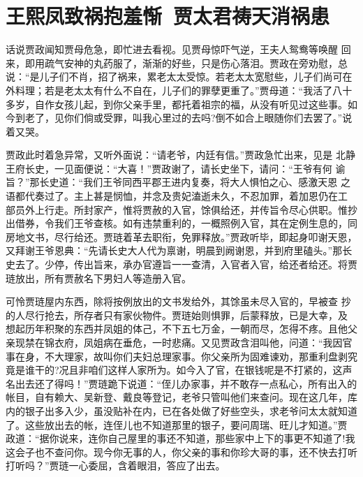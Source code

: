 \chapter{王熙凤致祸抱羞惭~贾太君祷天消祸患}

话说贾政闻知贾母危急，即忙进去看视。见贾母惊吓气逆，王夫人鸳鸯等唤醒
回来，即用疏气安神的丸药服了，渐渐的好些，只是伤心落泪。贾政在旁劝慰，总
说：“是儿子们不肖，招了祸来，累老太太受惊。若老太太宽慰些，儿子们尚可在
外料理；若是老太太有什么不自在，儿子们的罪孽更重了。”贾母道：“我活了八十
多岁，自作女孩儿起，到你父亲手里，都托着祖宗的福，从没有听见过这些事。如
今到老了，见你们倘或受罪，叫我心里过的去吗?倒不如合上眼随你们去罢了。”说
着又哭。

贾政此时着急异常，又听外面说：“请老爷，内廷有信。”贾政急忙出来，见是
北静王府长史，一见面便说：“大喜！”贾政谢了，请长史坐下，请问：“王爷有何
谕旨？”那长史道：“我们王爷同西平郡王进内复奏，将大人惧怕之心、感激天恩
之语都代奏过了。主上甚是悯恤，并念及贵妃溘逝未久，不忍加罪，着加恩仍在工
部员外上行走。所封家产，惟将贾赦的入官，馀俱给还，并传旨令尽心供职。惟抄
出借券，令我们王爷查核。如有违禁重利的，一概照例入官，其在定例生息的，同
房地文书，尽行给还。贾琏着革去职衔，免罪释放。”贾政听毕，即起身叩谢天恩，
又拜谢王爷恩典：“先请长史大人代为禀谢，明晨到阙谢恩，并到府里磕头。”那长
史去了。少停，传出旨来，承办官遵旨一一查清，入官者入官，给还者给还。将贾
琏放出，所有贾赦名下男妇人等造册入官。

可怜贾琏屋内东西，除将按例放出的文书发给外，其馀虽未尽入官的，早被查
抄的人尽行抢去，所存者只有家伙物件。贾琏始则惧罪，后蒙释放，已是大幸，及
想起历年积聚的东西并凤姐的体己，不下五七万金，一朝而尽，怎得不疼。且他父
亲现禁在锦衣府，凤姐病在垂危，一时悲痛。又见贾政含泪叫他，问道：“我因官
事在身，不大理家，故叫你们夫妇总理家事。你父亲所为固难谏劝，那重利盘剥究
竟是谁干的?况且非咱们这样人家所为。如今入了官，在银钱呢是不打紧的，这声
名出去还了得吗！”贾琏跪下说道：“侄儿办家事，并不敢存一点私心，所有出入的
帐目，自有赖大、吴新登、戴良等登记，老爷只管叫他们来查问。现在这几年，库
内的银子出多入少，虽没贴补在内，已在各处做了好些空头，求老爷问太太就知道
了。这些放出去的帐，连侄儿也不知道那里的银子，要问周瑞、旺儿才知道。”贾
政道：“据你说来，连你自己屋里的事还不知道，那些家中上下的事更不知道了!我
这会子也不查问你。现今你无事的人，你父亲的事和你珍大哥的事，还不快去打听
打听吗？”贾琏一心委屈，含着眼泪，答应了出去。

